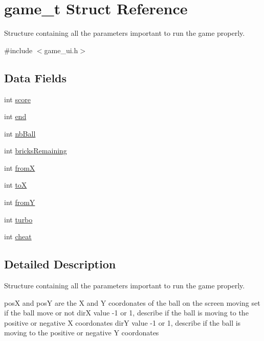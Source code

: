 \hypertarget{structgame__t}{}\section{game\+\_\+t Struct Reference}
\label{structgame__t}


Structure containing all the parameters important to run the game properly.  




{\ttfamily \#include $<$game\+\_\+ui.\+h$>$}

\subsection*{Data Fields}
\begin{DoxyCompactItemize}
\item 
int \hyperlink{structgame__t_aef160b7437d94056f1dc59646cd5b87d}{score}
\item 
int \hyperlink{structgame__t_abce9f5dc9c83f2639b72024fdee5d388}{end}
\item 
int \hyperlink{structgame__t_ae0c7df2c3c2bb3eb2aad3bfc63f563c3}{nb\+Ball}
\item 
int \hyperlink{structgame__t_a4e08ae0a019d63e85e4fb24954774f9d}{bricks\+Remaining}
\item 
int \hyperlink{structgame__t_a50491e00170f4adb355806cf91481163}{fromX}
\item 
int \hyperlink{structgame__t_a8da59cbd18dd05d7e77b0c9b47646fef}{toX}
\item 
int \hyperlink{structgame__t_a546e3a938f0bbf34f001c54c80a8d004}{fromY}
\item 
int \hyperlink{structgame__t_aee78eaf1a5ef0225bf8f0d146becc1ca}{turbo}
\item 
int \hyperlink{structgame__t_ae80b0201d378d6dfc9ecc3d67e3e364b}{cheat}
\end{DoxyCompactItemize}


\subsection{Detailed Description}
Structure containing all the parameters important to run the game properly. 

posX and posY are the X and Y coordonates of the ball on the screen moving set if the ball move or not dirX value -\/1 or 1, describe if the ball is moving to the positive or negative X coordonates dirY value -\/1 or 1, describe if the ball is moving to the positive or negative Y coordonates 

